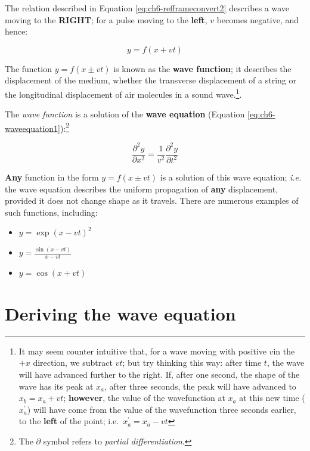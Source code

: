 \documentclass[
]{book}
\providecommand{\tightlist}{%
  \setlength{\itemsep}{0pt}\setlength{\parskip}{0pt}}
\begin{document}
The relation described in Equation \eqref{eq:ch6-refframeconvert2} describes a wave moving to the \textbf{RIGHT}; for a pulse moving to the \textbf{left}, \(v\) becomes negative, and hence:

\begin{equation}
y = f(x + vt)
\end{equation}

The function \(y = f(x \pm vt)\) is known as the \textbf{wave function}; it describes the displacement of the medium, whether the transverse displacement of a string or the longitudinal displacement of air molecules in a sound wave.\footnote{It may seem counter intuitive that, for a wave moving with positive \(v\)in the \(+x\) direction, we subtract \(vt\); but try thinking this way: after time \(t\), the wave will have advanced further to the right. If, after one second, the shape of the wave has its peak at \(x_a\), after three seconds, the peak will have advanced to \(x_b = x_a + vt\); \textbf{however}, the value of the wavefunction at \(x_a\) at this new time (\(x_a^\prime\)) will have come from the value of the wavefunction three seconds earlier, to the \textbf{left} of the point; i.e.~\(x_a^\prime = x_a - vt\)}.

The \emph{wave function} is a solution of the \textbf{wave equation} (Equation \eqref{eq:ch6-waveequation1}):\footnote{The \(\partial\) symbol refers to \emph{partial differentiation}.}

\begin{equation}
\frac{\partial^2 y}{\partial x^2} = \frac{1}{v^2} \frac{\partial^2 y}{\partial t^2}
\label{eq:ch6-waveequation1}
\end{equation}

\textbf{Any} function in the form \(y = f(x \pm vt)\) is a solution of this wave equation; \emph{i.e.} the wave equation describes the uniform propagation of \textbf{any} displacement, provided it does not change shape as it travels. There are numerous examples of such functions, including:

\begin{itemize}
\tightlist
\item
  \(y = \exp(x-vt)^2\)
\item
  \(y = \frac{\sin(x-vt)}{x-vt}\)
\item
  \(y = \cos (x+vt)\)
\end{itemize}

\hypertarget{sec:ch6-derivingwaveequation}{%
\section{Deriving the wave equation}\label{sec:ch6-derivingwaveequation}}
\end{document}
